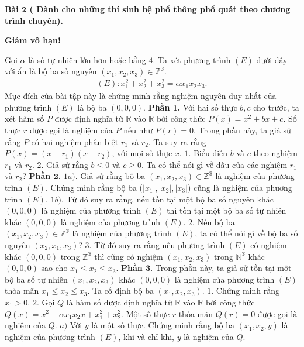 \begin{multicols}{2}
	\vskip 0.1cm 
	 \textbf{\color{cackithi}Bài $\pmb{2}$ ( Dành cho những thí sinh hệ phổ thông phổ quát theo chương trình chuyên).}
	\vskip 0.1cm 
	\centerline{ \textbf{\color{cackithi}Giảm vô hạn!}}
	\vskip 0.1cm 
	Gọi  $\alpha$ là số tự nhiên lớn hơn hoặc bằng $4$. Ta xét phương trình $(E)$ dưới đây với ẩn là bộ ba số nguyên $(x_1,x_2,x_3 ) \in \mathbb{Z^3}$.
	\begin{align*}
		(E): x_1^2+x_2^2+x_3^2= \alpha x_1x_2x_3.
	\end{align*}
	Mục đích của bài tập này là chứng minh rằng nghiệm nguyên duy nhất của phương trình $(E)$ là bộ ba $(0,0,0)$. 
	\vskip 0.1cm
	 \textbf{\color{cackithi}Phần $\pmb{1}$.} 
	\vskip 0.1cm
	Với hai số thực $b,c$ cho trước, ta xét hàm số $P$ được định nghĩa từ $\mathbb{R}$ vào $\mathbb{R}$ bởi công thức $P(x)=x^2+bx+c$. Số thực $r$ được gọi là nghiệm của $P$ nếu như $P(r)=0$. Trong phần này, ta giả sử rằng $P$ có hai nghiệm phân biệt $r_1$ và $r_2$. Ta suy ra rằng $P(x)=(x-r_1)(x-r_2)$, với mọi số thực $x$.
	\vskip 0.1cm 
	$1.$ Biểu diễn $b$ và $c$ theo nghiệm $r_1$ và $r_2$.
	\vskip 0.1cm
	$2.$ Giả sử rằng $b\le 0$ và $c\ge0$. Ta có thể nói gì về dấu của các nghiệm $r_1$ và $r_2$?
	\vskip 0.1cm 
	 \textbf{\color{cackithi}Phần $\pmb{2}$.}
	\vskip 0.1cm
	$1a)$. Giả sử rằng bộ ba $(x_1,x_2,x_3 ) \in \mathbb{Z^3}$ là nghiệm của phương trình $(E)$. Chứng minh rằng bộ ba ($|x_1 |,|x_2 |,|x_3 |$) cũng là nghiệm của phương trình $(E)$.
	\vskip 0.1cm
	$1b)$. Từ đó suy ra rằng, nếu tồn tại một bộ ba số nguyên khác $(0,0,0)$ là nghiệm của phương trình $(E)$ thì tồn tại một bộ ba số tự nhiên khác $(0,0,0)$ là nghiệm của phương trình $(E)$.
	\vskip 0.1cm 
	$2.$ Nếu bộ ba $(x_1,x_2,x_3 ) \in \mathbb{Z^3}$ là nghiệm của phương trình $(E)$, ta có thể nói gì về bộ ba số nguyên $(x_2,x_1,x_3)$?
	\vskip 0.1cm 
	$3.$ Từ đó suy ra rằng nếu phương trình $(E)$ có nghiệm khác $(0,0,0)$ trong $\mathbb{Z^3}$ thì cũng có nghiệm $(x_1,x_2,x_3)$ trong $\mathbb{N^3}$ khác $(0,0,0)$ sao cho $x_1 \le x_2 \le x_3$.
	\vskip 0.1cm 
	 \textbf{\color{cackithi}Phần $\pmb{3.}$}
	\vskip 0.1cm
	Trong phần này, ta giả sử tồn tại một bộ ba số tự nhiên $(x_1,x_2,x_3)$ khác $(0,0,0)$ là nghiệm của phương trình $(E)$ thỏa mãn $x_1 \le x_2 \le x_3$. Ta cố định bộ ba $(x_1,x_2,x_3)$.
	\vskip 0.1cm 
	$1.$ Chứng minh rằng $x_1>0$.
	\vskip 0.1cm
	$2.$ Gọi $Q$ là hàm số được định nghĩa từ $\mathbb{R}$ vào $\mathbb{R}$ bởi công thức $Q(x)=x^2- \alpha x_1 x_2 x+x_1^2+x_2^2$. Một số thực $r$ thỏa mãn $Q(r)=0$ được gọi là nghiệm của $Q$.
	\vskip 0.1cm 
	$a)$ Với $y$ là một số thực. Chứng minh rằng bộ ba $(x_1,x_2,y)$ là nghiệm của phương trình $(E)$, khi và chỉ khi, $y$ là nghiệm của $Q$.

\end{multicols}
